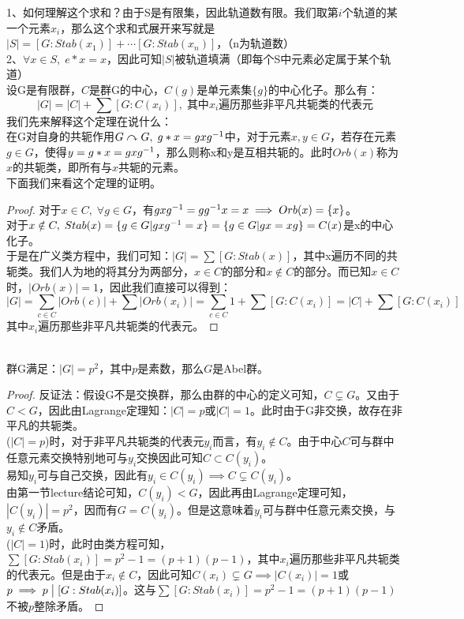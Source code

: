 1、如何理解这个求和？由于S是有限集，因此轨道数有限。我们取第$i$个轨道的某一个元素$x_i$，那么这个求和式展开来写就是$|S|=[G:Stab(x_1)]+\cdots [G:Stab(x_n)]$，（n为轨道数）\\
2、$\forall x\in S,\; e*x=x$，因此可知$|S|$被轨道填满（即每个S中元素必定属于某个轨道）\\
设G是有限群，$C$是群G的中心，$C(g)$是单元素集$\{g\}$的中心化子。那么有：
\[
|G|=|C|+\sum[G:C(x_i)],\; \text{其中}x_i \text{遍历那些非平凡共轭类的代表元}
\]
我们先来解释这个定理在说什么：\\
在G对自身的共轭作用$G\curvearrowright G,\; g*x=gx{g}^{-1}$中，对于元素$x,y\in G$，若存在元素$g\in G$，使得$y=g*x=gx{g}^{-1}$，那么则称x和y是互相共轭的。此时$Orb(x)$称为$x$的共轭类，即所有与$x$共轭的元素。\\
下面我们来看这个定理的证明。
\begin{proof}
对于$x\in C,\; \forall g\in G$，有$gx{g}^{-1}=g{g}^{-1}x=x\implies Orb(x)=\{x\}$。\\
对于$x\notin C,\; Stab(x)=\{g\in G|gx{g}^{-1}=x\}=\{g\in G| gx=xg\}=C(x)$是x的中心化子。\\
于是在广义类方程中，我们可知：$|G|=\sum [G:Stab(x)]$，其中x遍历不同的共轭类。我们人为地的将其分为两部分，$x\in C$的部分和$x\notin C$的部分。而已知$x\in C$时，$|Orb(x)|=1$，因此我们直接可以得到：
\[
|G|=\sum_{c\in C}|Orb(c)|+\sum|Orb(x_i)|=\sum_{c\in C}1+\sum[G:C(x_i)]=|C|+\sum[G:C(x_i)]
\]
其中$x_i$遍历那些非平凡共轭类的代表元。
\end{proof}
\\
群G满足：$|G|=p^2$，其中$p$是素数，那么$G$是Abel群。
\begin{proof}
反证法：假设G不是交换群，那么由群的中心的定义可知，$C\varsubsetneq G$。又由于$C<G$，因此由Lagrange定理知：$|C|=p$或$|C|=1$。此时由于G非交换，故存在非平凡的共轭类。\\
\indent ($|C|=p$)时，对于非平凡共轭类的代表元$y_i$而言，有$y_i\notin C$。由于中心$C$可与群中任意元素交换特别地可与$y_i$交换因此可知$C\subset C(y_i)$。\\
易知$y_i$可与自己交换，因此有$y_i\in C(y_i)\implies C\varsubsetneq C(y_i)$。\\
由第一节lecture结论可知，$C(y_i)<G$，因此再由Lagrange定理可知，$|C(y_i)|=p^2$，因而有$G=C(y_i)$。但是这意味着$y_i$可与群中任意元素交换，与$y_i\notin C$矛盾。\\
\indent ($|C|=1$)时，此时由类方程可知，$\sum [G:Stab(x_i)]=p^2-1=(p+1)(p-1)$，其中$x_i$遍历那些非平凡共轭类的代表元。但是由于$x_i\notin C$，因此可知$C(x_i)\varsubsetneq G\implies |C(x_i)|=1$或$p\implies p\bigm|[G:Stab(x_i)]$。这与$\sum [G:Stab(x_i)]=p^2-1=(p+1)(p-1)$不被$p$整除矛盾。
\end{proof}

